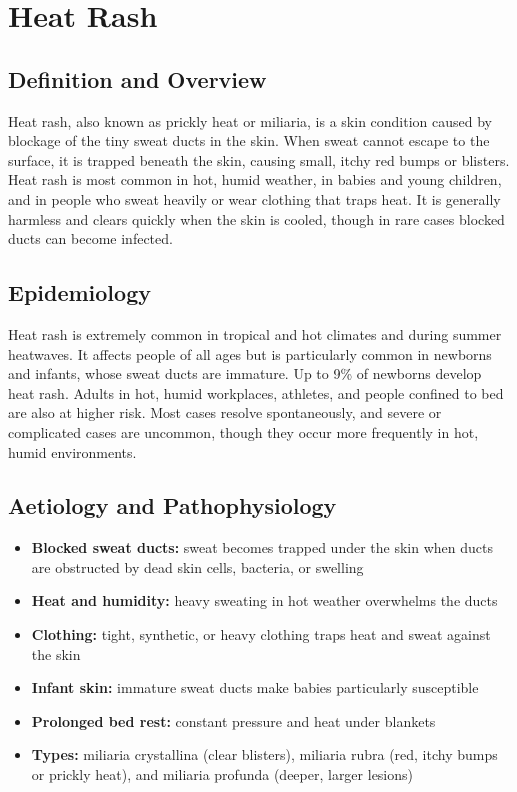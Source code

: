 \chapter{Heat Rash}

\section*{Definition and Overview}
Heat rash, also known as prickly heat or miliaria, is a skin condition caused by blockage of the tiny sweat ducts in the skin. When sweat cannot escape to the surface, it is trapped beneath the skin, causing small, itchy red bumps or blisters. Heat rash is most common in hot, humid weather, in babies and young children, and in people who sweat heavily or wear clothing that traps heat. It is generally harmless and clears quickly when the skin is cooled, though in rare cases blocked ducts can become infected.

\section*{Epidemiology}
Heat rash is extremely common in tropical and hot climates and during summer heatwaves. It affects people of all ages but is particularly common in newborns and infants, whose sweat ducts are immature. Up to 9\% of newborns develop heat rash. Adults in hot, humid workplaces, athletes, and people confined to bed are also at higher risk. Most cases resolve spontaneously, and severe or complicated cases are uncommon, though they occur more frequently in hot, humid environments.

\section*{Aetiology and Pathophysiology}
\begin{itemize}
    \item \textbf{Blocked sweat ducts:} sweat becomes trapped under the skin when ducts are obstructed by dead skin cells, bacteria, or swelling
    \item \textbf{Heat and humidity:} heavy sweating in hot weather overwhelms the ducts
    \item \textbf{Clothing:} tight, synthetic, or heavy clothing traps heat and sweat against the skin
    \item \textbf{Infant skin:} immature sweat ducts make babies particularly susceptible
    \item \textbf{Prolonged bed rest:} constant pressure and heat under blankets
    \item \textbf{Types:} miliaria crystallina (clear blisters), miliaria rubra (red, itchy bumps or prickly heat), and miliaria profunda (deeper, larger lesions)
\end{itemize}

